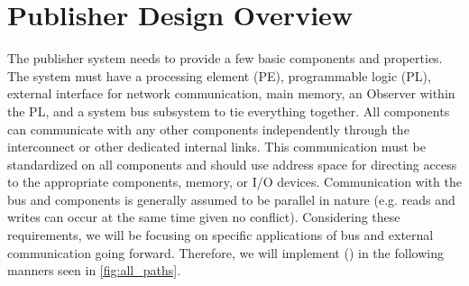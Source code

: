 \section{Publisher Design Overview}



The publisher system needs to provide a few basic components and properties. The system must have a processing element (PE), programmable logic (PL), external interface for network communication, main memory, an Observer within the PL, and a system bus subsystem to tie everything together. All components can communicate with any other components independently through the interconnect or other dedicated internal links. This communication must be standardized on all components and should use address space for directing access to the appropriate components, memory, or I/O devices. Communication with the bus and components is generally assumed to be parallel in nature (e.g. reads and writes can occur at the same time given no conflict). Considering these requirements, we will be focusing on specific applications of bus and external communication going forward. Therefore, we will implement \MethodNameLong (\MethodNameShort) in the following manners seen in \ref*{fig:all_paths}.




